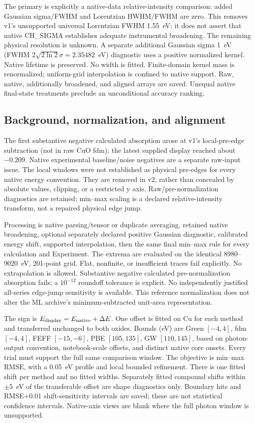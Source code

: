 The primary is explicitly a native-data relative-intensity comparison: added Gaussian sigma/FWHM and Lorentzian HWHM/FWHM are zero. This removes v1's unsupported universal Lorentzian FWHM 1.55~eV; it does not assert that native CH\_SIGMA establishes adequate instrumental broadening. The remaining physical resolution is unknown. A separate additional Gaussian sigma 1~eV (FWHM $2\sqrt{2\ln2}\sigma=2.35482$~eV) diagnostic uses a positive normalized kernel. Native lifetime is preserved. No width is fitted. Finite-domain kernel mass is renormalized; uniform-grid interpolation is confined to native support. Raw, native, additionally broadened, and aligned arrays are saved. Unequal native final-state treatments preclude an unconditional accuracy ranking.

\subsection{Background, normalization, and alignment}
The first substantive negative calculated absorption arose at v1's local-pre-edge subtraction (not in raw CuO fdm); the latest supplied display reached about $-0.209$. Native experimental baseline/noise negatives are a separate raw-input issue. The local windows were not established as physical pre-edges for every native energy convention. They are removed in v2, rather than concealed by absolute values, clipping, or a restricted y axis. Raw/pre-normalization diagnostics are retained; min--max scaling is a declared relative-intensity transform, not a repaired physical edge jump.

Processing is native parsing/tensor or duplicate averaging, retained native broadening, optional separately declared positive Gaussian diagnostic, calibrated energy shift, supported interpolation, then the same final min--max rule for every calculation and Experiment. The extrema are evaluated on the identical 8980--9020~eV, 201-point grid. Flat, nonfinite, or insufficient traces fail explicitly. No extrapolation is allowed. Substantive negative calculated pre-normalization absorption fails; a $10^{-12}$ roundoff tolerance is explicit. No independently justified all-series edge-jump sensitivity is available. This reference normalization does not alter the ML archive's minimum-subtracted unit-area representation.

The sign is $E_{\rm display}=E_{\rm native}+\Delta E$. One offset is fitted on Cu for each method and transferred unchanged to both oxides. Bounds (eV) are Green $[-4,4]$, fdm $[-4,4]$, FEFF $[-15,-6]$, PBE $[105,135]$, GW $[110,145]$, based on photon-output convention, notebook-scale offsets, and distinct native core onsets. Every trial must support the full same comparison window. The objective is min--max RMSE, with a 0.05~eV profile and local bounded refinement. There is one fitted shift per method and no fitted widths. Separately fitted compound shifts within $\pm5$~eV of the transferable offset are shape diagnostics only. Boundary hits and RMSE+0.01 shift-sensitivity intervals are saved; these are not statistical confidence intervals. Native-axis views are blank where the full photon window is unsupported.

